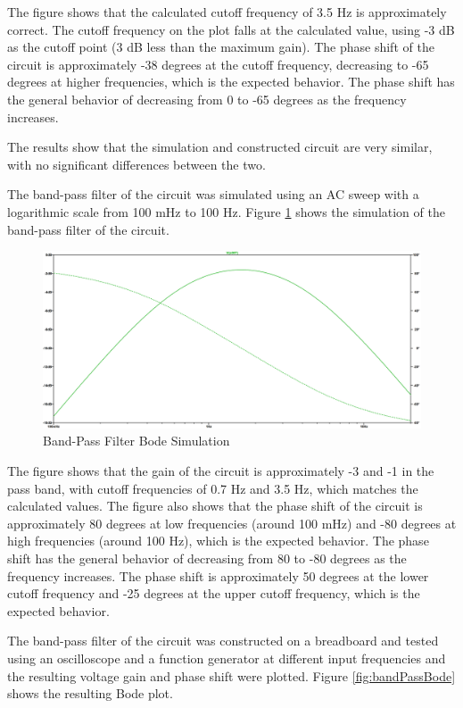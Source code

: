 \documentclass[CMPE]{KGCOEReport}
\begin{document}
The figure shows that the calculated cutoff frequency of 3.5 Hz is approximately correct. The cutoff frequency on the plot falls at the calculated value, using -3 dB as the cutoff point (3 dB less than the maximum gain). The phase shift of the circuit is approximately -38 degrees at the cutoff frequency, decreasing to -65 degrees at higher frequencies, which is the expected behavior. The phase shift has the general behavior of decreasing from 0 to -65 degrees as the frequency increases.

The results show that the simulation and constructed circuit are very similar, with no significant differences between the two.

\bigskip

The band-pass filter of the circuit was simulated using an AC sweep with a logarithmic scale from 100 mHz to 100 Hz. Figure \ref{fig:bandPassSim} shows the simulation of the band-pass filter of the circuit.

\begin{figure}[H]
    \centering
    \includegraphics[width=1\textwidth]{SimFreqBandPass.png}
    \caption{Band-Pass Filter Bode Simulation}
    \label{fig:bandPassSim}
\end{figure}

The figure shows that the gain of the circuit is approximately -3 and -1 in the pass band, with cutoff frequencies of 0.7 Hz and 3.5 Hz, which matches the calculated values. The figure also shows that the phase shift of the circuit is approximately 80 degrees at low frequencies (around 100 mHz) and -80 degrees at high frequencies (around 100 Hz), which is the expected behavior. The phase shift has the general behavior of decreasing from 80 to -80 degrees as the frequency increases. The phase shift is approximately 50 degrees at the lower cutoff frequency and -25 degrees at the upper cutoff frequency, which is the expected behavior.

The band-pass filter of the circuit was constructed on a breadboard and tested using an oscilloscope and a function generator at different input frequencies and the resulting voltage gain and phase shift were plotted. Figure \ref{fig:bandPassBode} shows the resulting Bode plot.
\end{document}
